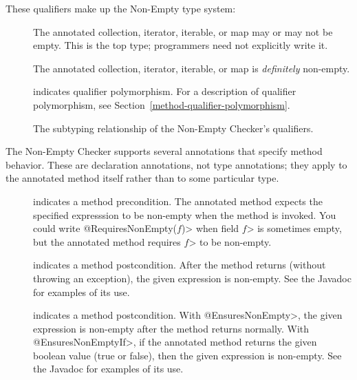 
These qualifiers make up the Non-Empty type system:

\begin{description}

\item[]
  The annotated collection, iterator, iterable, or map may or may not be empty.
  This is the top type; programmers need not explicitly write it.

\item[]
  The annotated collection, iterator, iterable, or map is \emph{definitely}
  non-empty.

\item[]
  indicates qualifier polymorphism.
  For a description of qualifier polymorphism, see
  Section~\ref{method-qualifier-polymorphism}.

\end{description}

\begin{figure}
\caption{The subtyping relationship of the Non-Empty Checker's qualifiers.}
\label{fig-nonempty-hierarchy}
\end{figure}


The Non-Empty Checker supports several annotations that specify method
behavior.  These are declaration annotations, not type annotations;  they
apply to the annotated method itself rather than to some particular type.

\begin{description}

\item[]
  indicates a method precondition.  The annotated method expects the
  specified expresssion to be non-empty when the
  method is invoked.  You could write \<@RequiresNonEmpty($f$)> when field
  \<$f$> is sometimes empty, but the annotated method requires
  \<$f$> to be non-empty.

\item[]
  indicates a method postcondition.  After the method returns (without
  throwing an exception), the given
  expression is non-empty. See the Javadoc for examples of its use.

\item[]
  indicates a method postcondition.  With \<@EnsuresNonEmpty>, the given
  expression is non-empty after the method returns normally.  With
  \<@EnsuresNonEmptyIf>, if the annotated
  method returns the given boolean value (true or false), then the given
  expression is non-empty. See the Javadoc for examples of its use.

\end{description}


